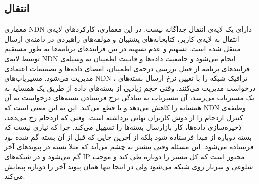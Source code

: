 \subsection{انتقال}
\label{section:enteghal}
معماری NDN  دارای یک لایه‌ی انتقال جداگانه نیست. در این معماری، کارکردهای لایه‌ی انتقال به لایه‌ی کاربر، کتابخانه‌های پشتیبان و مولفه‌‌های راهبردی در دامنه‌ی ارسال منتقل شده است. تسهیم و عدم تسهیم در بین فرایندهای برنامه‌ها به طور مستقیم توسط لایه‌ی NDN انجام می‌شود و جامعیت داده‌ها و قابلیت اطمینان به وسیله‌ی فرایندهای برنامه از قبیل بررسی درجه‌ی اطمینان، امضای داده‌ها و تصمیمات اعتمادی مدیریت می‌شود. 
مسیریاب‌‌های ‌NDN ، ترافیک شبکه را با تعیین نرخ ارسال بسته‌های درخواست مدیریت می‌کنند.  وقتی حجم زیادیی از بسته‌های داده از طریق یک همسایه به یک مسیریاب می‌رسد، آن مسیریاب به سادگی نرخ فرستادن بسته‌های درخواست به آن همسایه را کاهش می‌دهد و یا قطع می‌کند. این به این معنی است که NDN وظیفه‌ی کنترل ازدحام را از دوش کاربران نهایی برداشته است. وقتی که ازدحام رخ می‌دهد، ذخیره‌سازی داده‌ها، کار بازارسال بسته‌ها را تسهیل می‌کند. چرا که نیازی نیست که بسته دوباره از مبدا فرستاده شود بلکه از آخرین جایی که قبل از آن بسته گم شده بود فرستاده می‌شود. این مسئله وقتی بیشتر به چشم می‌آید که مثلا بسته در پیوندهای آخر گم می‌شود و در شبکه‌‌های IP مجبور است که کل مسیر را دوباره طی کند و موجب شلوغی و سربار روی شبکه می‌شود ولی در اینجا تنها همان پیوند آخر را دوباره پیمایش می‌کند.   


